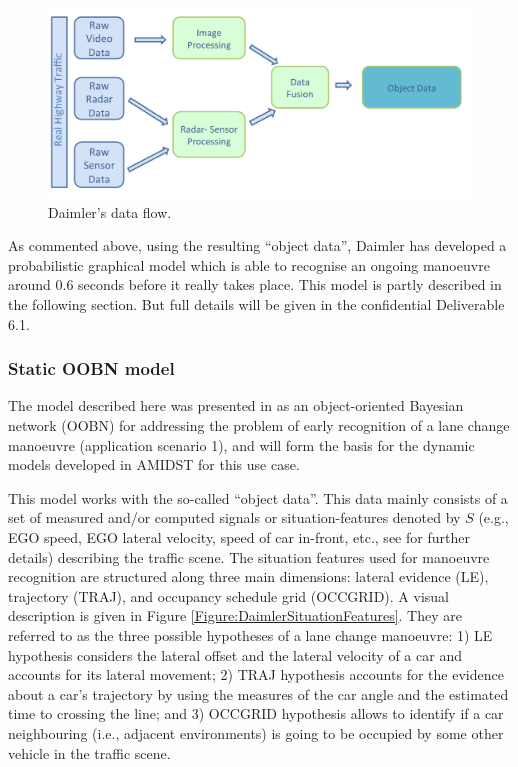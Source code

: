 \begin{figure}[ht!]
\begin{center}
\includegraphics[scale=0.35]{./figures/DaimlerDataFlow}
\caption{\label{Figure:DaimlerDataFlow} Daimler's data flow.}
\end{center}
\end{figure}

As commented above, using the resulting ``object data'', Daimler has developed a probabilistic graphical model \cite{kasper2012object} which is able to recognise an ongoing manoeuvre around 0.6 seconds before it really takes place.  This model is partly described in the following section. But full details will be given in the confidential Deliverable 6.1.  

\subsubsection*{Static OOBN model}

The model described here was presented in \cite{kasper2012object} as an object-oriented Bayesian network (OOBN) \cite{KollerPfeffer1997} for addressing the problem of early recognition of a lane change manoeuvre (application scenario 1), and will form the basis for the dynamic models developed in AMIDST for this use case.

This model works with the so-called ``object data''. This data mainly consists of a set of measured and/or computed signals or situation-features denoted by $S$ (e.g., EGO speed, EGO lateral velocity, speed of car in-front, etc., see \cite{kasper2012object} for further details) describing the traffic scene. The situation features used for manoeuvre recognition are structured along three main dimensions: lateral evidence (LE), trajectory (TRAJ), and occupancy schedule grid (OCCGRID).  A visual description is given in Figure \ref{Figure:DaimlerSituationFeatures}. They are referred to as the three possible hypotheses of a lane change manoeuvre: 1) LE hypothesis considers the lateral offset and the lateral velocity of a car and accounts for its lateral movement; 2) TRAJ hypothesis accounts for the evidence about a car's trajectory by using the measures of the car angle and the estimated time to crossing the line; and 3) OCCGRID hypothesis allows to identify if a car neighbouring (i.e., adjacent environments) is going to be occupied by some other vehicle in the traffic scene. 

